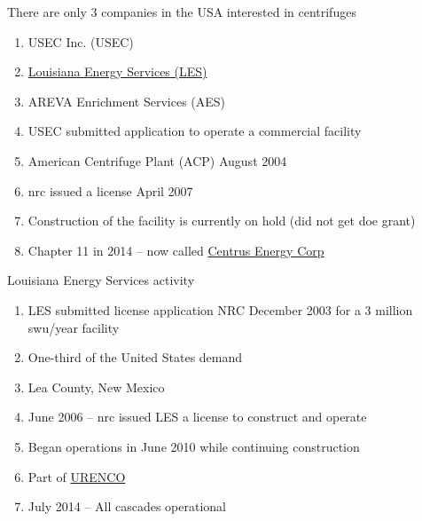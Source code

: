 \documentclass[aspectratio=1610,pdftex,dvipsnames,compress,xcolor={dvipsnames}]{beamer}
\newcommand{\acs}{\acrshort} %
\begin{document}
\begin{frame}{There are only 3 companies in the USA interested in centrifuges}
    \begin{enumerate}[topsep=0pt,itemsep=15pt,leftmargin=*,label=(\arabic*)]
        \item[]USEC Inc. (USEC)
        \item[]\href{https://www.nirs.org/les/}{Louisiana Energy Services (LES)}
        \item[]AREVA Enrichment Services (AES)
        \item[]USEC submitted application to operate a commercial facility
        \item[]American Centrifuge Plant (ACP) August 2004
        \item[]\acs{nrc} issued a license April 2007 
        \item[]Construction of the facility is currently on hold (did not get \acs{doe} grant)
        \item[]Chapter 11 in 2014 -- now called \href{http://www.centrusenergy.com/}{Centrus Energy Corp}
    \end{enumerate}
\end{frame}


\begin{frame}{Louisiana Energy Services activity}
    \begin{enumerate}[topsep=0pt,itemsep=15pt,leftmargin=*,label=(\arabic*)]
        \item[]LES submitted license application NRC December 2003 for a 3 million \acs{swu}/year facility
        \item[]One-third of the United States demand
        \item[]Lea County, New Mexico
        \item[]June 2006 -- \acs{nrc} issued LES a license to construct and operate
        \item[]Began operations in June 2010 while continuing construction
        \item[]Part of \href{https://www.urenco.com/global-operations}{URENCO}
        \item[]July 2014 -- All cascades operational
    \end{enumerate}
\end{frame}
\end{document}

